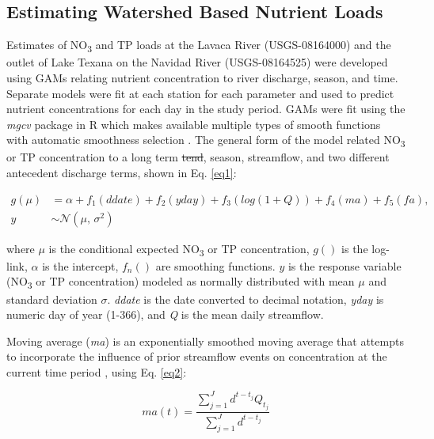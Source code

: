 \documentclass[fleqn,10pt,lineno]{wlpeerj} %
\providecommand{\DIFaddtex}[1]{{\protect\color{blue}\uwave{#1}}} %
\providecommand{\DIFdeltex}[1]{{\protect\color{red}\sout{#1}}}                      %
\providecommand{\DIFaddbegin}{} %
\providecommand{\DIFaddend}{} %
\providecommand{\DIFdelbegin}{} %
\providecommand{\DIFdelend}{} %
\providecommand{\DIFadd}[1]{\texorpdfstring{\DIFaddtex{#1}}{#1}} %
\providecommand{\DIFdel}[1]{\texorpdfstring{\DIFdeltex{#1}}{}} %
\begin{document}
\hypertarget{estimating-watershed-based-nutrient-loads}{%
\subsection*{Estimating Watershed Based Nutrient
Loads}\label{estimating-watershed-based-nutrient-loads}}

Estimates of NO\textsubscript{3} and TP loads at the Lavaca River
(USGS-08164000) and the outlet of Lake Texana on the Navidad River
(USGS-08164525) were developed using GAMs relating nutrient
concentration to river discharge, season, and time. Separate models were
fit at each station for each parameter and used to predict nutrient
concentrations for each day in the study period. GAMs were fit using the
\emph{mgcv} package in R which makes available multiple types of smooth
functions with automatic smoothness selection
\autocite{woodFastStableRestricted2011}. The general form of the model
related NO\textsubscript{3} or TP concentration to a long term \DIFdelbegin \DIFdel{tend}\DIFdelend \DIFaddbegin \DIFadd{trend}\DIFaddend ,
season, streamflow, and two different antecedent discharge terms, shown
in Eq. \ref{eq1}:

\begin{align}
g(\mu) &= \alpha + f_1(ddate) + f_2(yday) + f_3(log(1+Q)) + f_4(ma) + f_5(fa), \nonumber \\
y &\sim \mathcal{N}(\mu,\,\sigma^{2})
\label{eq1}
\end{align}

where \(\mu\) is the conditional expected NO\textsubscript{3} or TP
concentration, \(g()\) is the log-link, \(\alpha\) is the intercept,
\(f_n()\) are smoothing functions. \(y\) is the response variable
(NO\textsubscript{3} or TP concentration) modeled as normally
distributed with mean \(\mu\) and standard deviation \(\sigma\).
\emph{ddate} is the date converted to decimal notation, \emph{yday} is
numeric day of year (1-366), and \emph{Q} is the mean daily streamflow.

Moving average (\emph{ma}) is an exponentially smoothed moving average
that attempts to incorporate the influence of prior streamflow events on
concentration at the current time period
\autocite{wangLoadEstimationUncertainties2011,kuhnertQuantifyingTotalSuspended2012,zhang_improving_2017},
using Eq. \ref{eq2}:

\begin{equation}
ma(t) = \frac{\sum^{J}_{j=1}{d^{t-t_j}Q_{t_{j}}}}{\sum^{J}_{j=1}d^{t-t_j}}
\label{eq2}
\end{equation}
\end{document}
